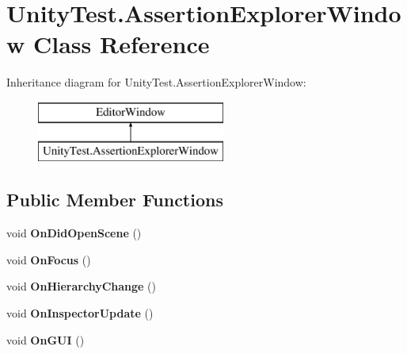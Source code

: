 \hypertarget{class_unity_test_1_1_assertion_explorer_window}{}\section{Unity\+Test.\+Assertion\+Explorer\+Window Class Reference}
\label{class_unity_test_1_1_assertion_explorer_window}
Inheritance diagram for Unity\+Test.\+Assertion\+Explorer\+Window\+:\begin{figure}[H]
\begin{center}
\leavevmode
\includegraphics[height=2.000000cm]{class_unity_test_1_1_assertion_explorer_window}
\end{center}
\end{figure}
\subsection*{Public Member Functions}
\begin{DoxyCompactItemize}
\item 
\mbox{\label{class_unity_test_1_1_assertion_explorer_window_af2f1b477aed7dab4366506c07432cd1e}} 
void {\bfseries On\+Did\+Open\+Scene} ()
\item 
\mbox{\label{class_unity_test_1_1_assertion_explorer_window_a18aa25672464da90bd062c034e75310d}} 
void {\bfseries On\+Focus} ()
\item 
\mbox{\label{class_unity_test_1_1_assertion_explorer_window_a002fcc4595ace1102afbe20dc39347f4}} 
void {\bfseries On\+Hierarchy\+Change} ()
\item 
\mbox{\label{class_unity_test_1_1_assertion_explorer_window_a321fdd7e33a887d553b471b3ae97a4ae}} 
void {\bfseries On\+Inspector\+Update} ()
\item 
\mbox{\label{class_unity_test_1_1_assertion_explorer_window_a6c8ff0c456d657666579774c375a55bf}} 
void {\bfseries On\+G\+UI} ()
\end{DoxyCompactItemize}
